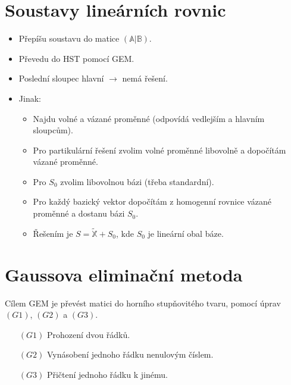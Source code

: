 \documentclass{../szzclass}
\begin{document}
\section{Soustavy lineárních rovnic}
\begin{itemize}
\item Přepíšu soustavu do matice $(\mathbb{A}|\mathbb{B})$.
\item Převedu do HST pomocí GEM.
\item Poslední sloupec hlavní $\rightarrow$ nemá řešení.
\item Jinak:
  \begin{itemize}
  \item Najdu volné a vázané proměnné (odpovídá vedlejším a hlavním sloupcům).
  \item Pro partikulární řešení zvolim volné proměnné libovolně a dopočítám vázané proměnné.
  \item Pro $S_0$ zvolim libovolnou bázi (třeba standardní).
  \item Pro každý bazický vektor dopočítám z homogenní rovnice vázané proměnné a dostanu bázi $S_0$.
  \item Řešením je $S=\widetilde{\mathbb{X}}+S_0$, kde $S_0$ je lineární obal báze.
  \end{itemize}
\end{itemize}

\section{Gaussova eliminační metoda}
Cílem GEM je převést matici do horního stupňovitého tvaru, pomocí úprav $(G1)$, $(G2)$ a $(G3)$.

\begin{itemize}
\item[$(G1)$] Prohození dvou řádků.
\item[$(G2)$] Vynásobení jednoho řádku nenulovým číslem.
\item[$(G3)$] Přičtení jednoho řádku k jinému.
\end{itemize}
\end{document}

